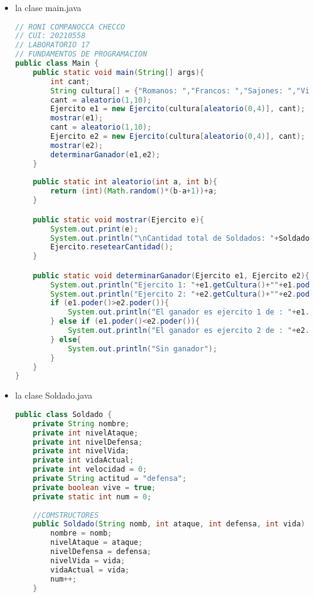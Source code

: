 \documentclass{article}
\begin{document}
\begin{itemize}
\begin{itemize}
        \item la clase main.java
        
        \begin{lstlisting}[language=java]
// RONI COMPANOCCA CHECCO
// CUI: 20210558
// LABORATORIO 17
// FUNDAMENTOS DE PROGRAMACION 
public class Main {
    public static void main(String[] args){
        int cant;
        String cultura[] = {"Romanos: ","Francos: ","Sajones: ","Visigodos: ","Vandalos: "};
        cant = aleatorio(1,10);
        Ejercito e1 = new Ejercito(cultura[aleatorio(0,4)], cant);
        mostrar(e1);
        cant = aleatorio(1,10);
        Ejercito e2 = new Ejercito(cultura[aleatorio(0,4)], cant);
        mostrar(e2);
        determinarGanador(e1,e2);
    }
    
    public static int aleatorio(int a, int b){
        return (int)(Math.random()*(b-a+1))+a;
    }

    public static void mostrar(Ejercito e){
        System.out.print(e);
        System.out.println("\nCantidad total de Soldados: "+Soldado.cuantos()+"\n"+"Espadachines: "+Espadachin.cuantos()+"\n"+"Arqueros: "+Arquero.cuantos()+"\n"+"Caballeros: "+Caballero.cuantos()+"\n");
        Ejercito.resetearCantidad();
    }

    public static void determinarGanador(Ejercito e1, Ejercito e2){
        System.out.println("Ejercito 1: "+e1.getCultura()+""+e1.poder());
        System.out.println("Ejercito 2: "+e2.getCultura()+""+e2.poder());
        if (e1.poder()>e2.poder()){
            System.out.println("El ganador es ejercito 1 de : "+e1.getCultura());
        } else if (e1.poder()<e2.poder()){
            System.out.println("El ganador es ejercito 2 de : "+e2.getCultura());
        } else{
            System.out.println("Sin ganador");
        }
    }
}


        \end{lstlisting}

        \item la clase Soldado.java
        \begin{lstlisting}[language=java]
public class Soldado {
	private String nombre;
    private int nivelAtaque;
    private int nivelDefensa;
    private int nivelVida;
    private int vidaActual;
    private int velocidad = 0;
    private String actitud = "defensa";
    private boolean vive = true;
    private static int num = 0;
	
    //COMSTRUCTORES
	public Soldado(String nomb, int ataque, int defensa, int vida) {
		nombre = nomb;
        nivelAtaque = ataque;
        nivelDefensa = defensa;
        nivelVida = vida;
        vidaActual = vida;
        num++;
	}


\end{lstlisting}
\end{itemize}
\end{itemize}
\end{document}
